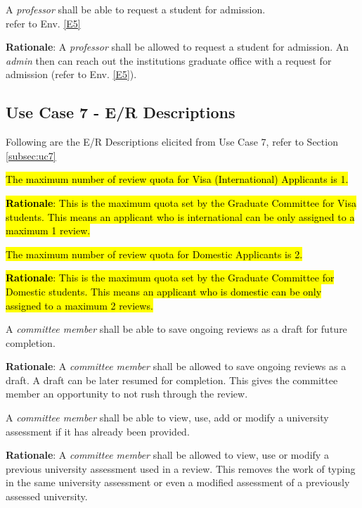 \documentclass[fontsize=12pt,paper=letter,twoside]{scrartcl}
\begin{document}
\rdescription
{A \emph{professor} shall be able to request a student for admission.\\}
{refer to Env. \ref{E5}}
\label{R24}

\smallskip
\noindent \textbf{Rationale}: A \emph{professor} shall be allowed to request a student for admission. An \emph{admin} then can reach out the institutions graduate office with a request for admission (refer to Env. \ref{E5}).

\subsection{Use Case 7 - E/R Descriptions}

Following are the E/R Descriptions elicited from Use Case 7, refer to Section \ref{subsec:uc7}

\genenv
{\hl{The maximum number of review quota for Visa (International) Applicants is 1.}}

\smallskip
\noindent \hl{\textbf{Rationale}: This is the maximum quota set by the Graduate Committee for Visa students. This means an applicant who is international can be only assigned to a maximum 1 review.}
\label{E6}

\genenv
{\hl{The maximum number of review quota for Domestic Applicants is 2.}}
\label{E7}

\smallskip
\noindent \hl{\textbf{Rationale}: This is the maximum quota set by the Graduate Committee for Domestic students. This means an applicant who is domestic can be only assigned to a maximum 2 reviews.}

\genreq
{A \emph{committee member} shall be able to save ongoing reviews as a draft for future completion.\\}
{}
\label{R26}

\smallskip
\noindent \textbf{Rationale}: A \emph{committee member} shall be allowed to save ongoing reviews as a draft. A draft can be later resumed for completion. This gives the committee member an opportunity to not rush through the review.

\genreq
{A \emph{committee member} shall be able to view, use, add or modify a university assessment if it has already been provided.\\}
{}
\label{R27}

\smallskip
\noindent \textbf{Rationale}: A \emph{committee member} shall be allowed to view, use or modify a previous university assessment used in a review. This removes the work of typing in the same university assessment or even a modified assessment of a previously assessed university.
\end{document}
